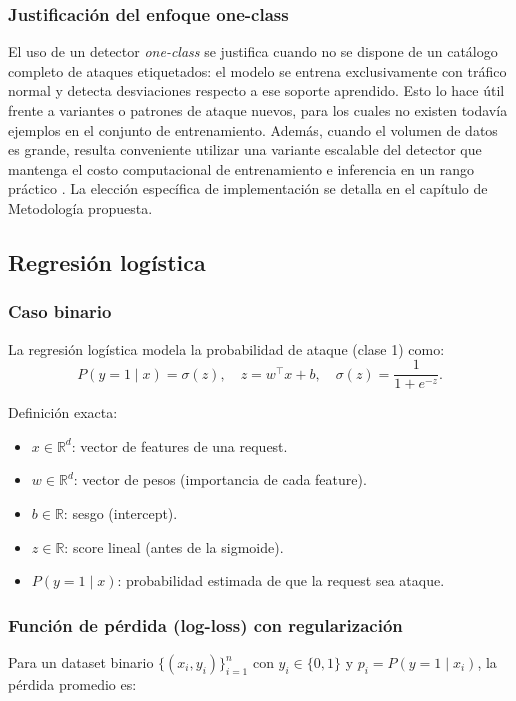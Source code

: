 \documentclass[12pt,oneside]{report}
\newcommand{\R}{\mathbb{R}}
\newcommand{\sigmoid}{\sigma}
\begin{document}
\subsubsection{Justificación del enfoque one-class}
El uso de un detector \textit{one-class} se justifica cuando no se dispone de un catálogo completo de ataques etiquetados: el modelo se entrena exclusivamente con tráfico normal y detecta desviaciones respecto a ese soporte aprendido. Esto lo hace útil frente a variantes o patrones de ataque nuevos, para los cuales no existen todavía ejemplos en el conjunto de entrenamiento. Además, cuando el volumen de datos es grande, resulta conveniente utilizar una variante escalable del detector que mantenga el costo computacional de entrenamiento e inferencia en un rango práctico \cite{sklearn_sgd_ocsvm,sklearn_kernel_approx}. La elección específica de implementación se detalla en el capítulo de Metodología propuesta.

\subsection{Regresión logística}
\subsubsection{Caso binario}
La regresión logística modela la probabilidad de ataque (clase 1) como:
\[
P(y=1\mid x)=\sigmoid(z), \quad z=w^\top x + b, \quad \sigmoid(z)=\frac{1}{1+e^{-z}}.
\]

Definición exacta:
\begin{itemize}[leftmargin=*]
  \item $x \in \R^d$: vector de features de una request.
  \item $w \in \R^d$: vector de pesos (importancia de cada feature).
  \item $b \in \R$: sesgo (intercept).
  \item $z \in \R$: score lineal (antes de la sigmoide).
  \item $P(y=1\mid x)$: probabilidad estimada de que la request sea ataque.
\end{itemize}

\subsubsection{Función de pérdida (log-loss) con regularización}
Para un dataset binario $\{(x_i,y_i)\}_{i=1}^n$ con $y_i\in\{0,1\}$ y $p_i=P(y=1\mid x_i)$, la pérdida promedio es:
\end{document}
